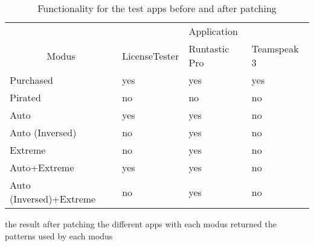 \begin{table}[h]
\centering
\begin{tabular}{llll}
                                             & \multicolumn{3}{c}{Application}             \\
\multicolumn{1}{c|}{Modus}                   & LicenseTester & Runtastic Pro & Teamspeak 3 \\ \hline
\multicolumn{1}{l|}{Purchased}               & yes           & yes           & yes         \\
\multicolumn{1}{l|}{Pirated}                 & no            & no            & no          \\
\multicolumn{1}{l|}{Auto}                    & yes           & yes           & no          \\
\multicolumn{1}{l|}{Auto (Inversed)}         & no            & yes           & no          \\
\multicolumn{1}{l|}{Extreme}                 & no            & yes           & no          \\
\multicolumn{1}{l|}{Auto+Extreme}            & yes           & yes           & no          \\
\multicolumn{1}{l|}{Auto (Inversed)+Extreme} & no            & yes           & no
\end{tabular}
\caption{Functionality for the test apps before and after patching}
\label{table:functionality}
\end{table}

the result after patching the different apps with each modus returned the patterns used by each modus
